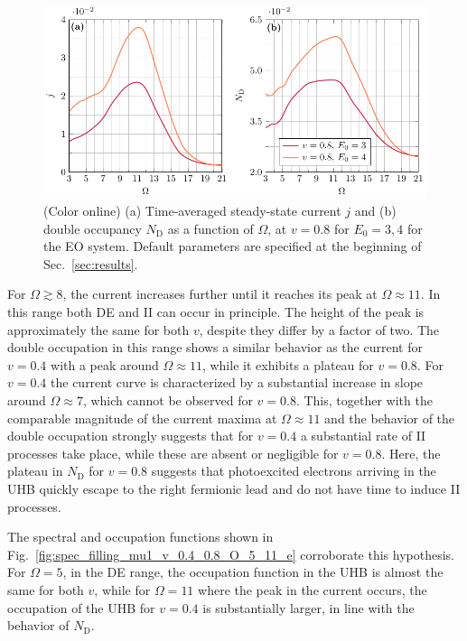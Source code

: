\documentclass[aps,prb,groupedaddress,showpacs,twocolumn,superscriptaddress,10pt]{revtex4-2}
\begin{document}
\begin{figure}[b]  
\includegraphics[width=\linewidth]{./figures_Paper1/j_vs_omega_mu1_v_0.8_e_E0_3_4.pdf} 
\caption{(Color online) (a) Time-averaged steady-state current $j$ and (b) double occupancy $N_{\text{D}}$ as a function of $\Omega$, at $v=0.8$ for $E_0=3,4$ for the EO system. Default parameters are specified at the beginning of Sec.~\ref{sec:results}.} 
\label{fig:j_vs_omega_mu1_v_0.8_e_E0_3_4}
\end{figure}

For $\Omega\gtrsim8$, the current increases further until it reaches its peak at $\Omega\approx 11$.
In this range both DE and II can occur in principle. The height of the peak is approximately the same for both $v$, despite
they differ by a factor of two.
The double occupation in this range shows a similar behavior as the current for $v=0.4$ with a peak around $\Omega\approx 11$, while it exhibits a plateau for $v=0.8$.
For $v=0.4$ the current curve is characterized by a substantial increase in slope around $\Omega \approx 7$, which cannot be observed for $v=0.8$. This, together with the comparable magnitude of the
current
maxima at $\Omega\approx 11$ and the behavior of the double occupation strongly suggests that for $v=0.4$ a substantial rate of II processes take place, while these are absent or negligible for $v=0.8$.
Here,  the plateau in $N_{\text{D}}$ for $v=0.8$ suggests that photoexcited electrons arriving in the UHB quickly escape to the right fermionic lead and do not have time to induce II processes.

The spectral and occupation functions shown in Fig.~\ref{fig:spec_filling_mu1_v_0.4_0.8_O_5_11_e} corroborate this hypothesis. For $\Omega=5$, in the DE range, the occupation function in the UHB is almost the same for both $v$, while for $\Omega=11$ where the peak in the current occurs, the occupation of the UHB for $v=0.4$ is substantially larger,  in line with the behavior of $N_{\text{D}}$. 
\end{document}
